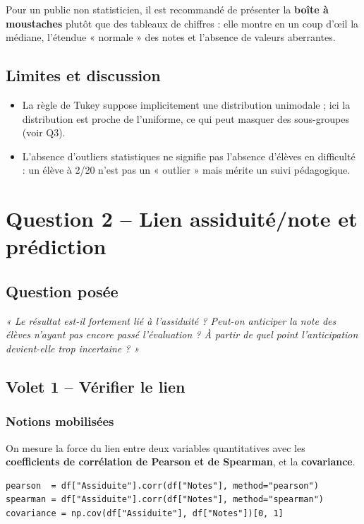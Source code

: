 \documentclass[11pt,a4paper]{article}
\begin{document}
Pour un public non statisticien, il est recommandé de présenter la \textbf{boîte à
moustaches} plutôt que des tableaux de chiffres : elle montre en un coup d'œil la
médiane, l'étendue « normale » des notes et l'absence de valeurs aberrantes.

\subsection{Limites et discussion}
\begin{itemize}
\item La règle de Tukey suppose implicitement une distribution unimodale ; ici la
distribution est proche de l'uniforme, ce qui peut masquer des sous-groupes (voir Q3).
\item L'absence d'outliers statistiques ne signifie pas l'absence d'élèves en difficulté :
un élève à 2/20 n'est pas un « outlier » mais mérite un suivi pédagogique.
\end{itemize}

\section{Question 2 -- Lien assiduité/note et prédiction}

\subsection{Question posée}
\textit{« Le résultat est-il fortement lié à l'assiduité ? Peut-on anticiper la note des
élèves n'ayant pas encore passé l'évaluation ? À partir de quel point l'anticipation
devient-elle trop incertaine ? »}

\subsection{Volet 1 -- Vérifier le lien}

\subsubsection{Notions mobilisées}
On mesure la force du lien entre deux variables quantitatives avec les
\textbf{coefficients de corrélation de Pearson et de Spearman}, et la
\textbf{covariance}.

\begin{lstlisting}
pearson  = df["Assiduite"].corr(df["Notes"], method="pearson")
spearman = df["Assiduite"].corr(df["Notes"], method="spearman")
covariance = np.cov(df["Assiduite"], df["Notes"])[0, 1]
\end{lstlisting}
\end{document}
